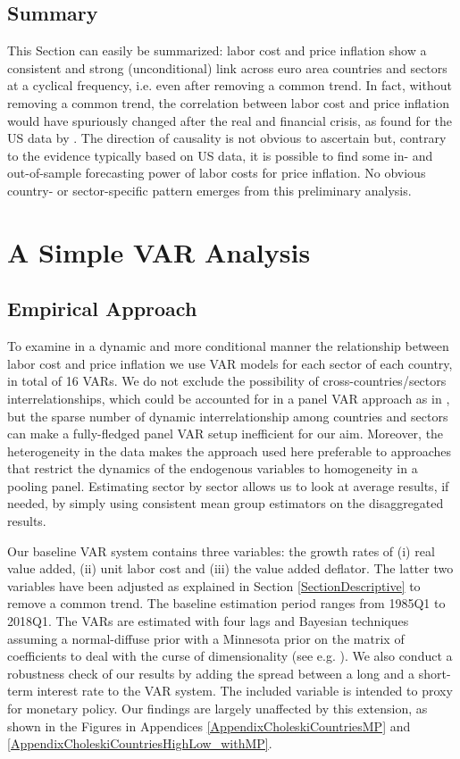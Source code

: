 \documentclass[11pt]{article}
\begin{document}
\subsection{Summary}
This Section can easily be summarized: labor cost and price inflation show a consistent and strong (unconditional) link across euro area countries and sectors at a cyclical frequency, i.e. even after removing a common trend. In fact, without removing a common trend, the correlation between labor cost and price inflation would have spuriously changed after the real and financial crisis, as found for the US data by \cite{Peneva_Rudd_2017}. The direction of causality is not obvious to ascertain but, contrary to the evidence typically based on US data, it is possible to find some in- and out-of-sample forecasting power of labor costs for price inflation. No obvious country- or sector-specific pattern emerges from this preliminary analysis.    

\section{A Simple VAR Analysis}
\subsection{Empirical Approach}
\label{SubSectionempirical}
To examine in a dynamic and more conditional manner the relationship between labor cost and price inflation we use VAR models for each sector of each country, in total of 16 VARs. We do not exclude the possibility of cross-countries/sectors interrelationships, which could be accounted for in a panel VAR approach as in \cite{CanovaCiccarelli09}, but the sparse number of dynamic interrelationship among countries and sectors can make a fully-fledged panel VAR setup inefficient for our aim. Moreover, the heterogeneity in the data makes the approach used here preferable to approaches that restrict the dynamics of the endogenous variables to homogeneity in a pooling panel. Estimating sector by sector allows us to look at average results, if needed, by simply using consistent mean group estimators on the disaggregated results. 

Our baseline VAR system contains three variables: the growth rates of (i) real value added, (ii) unit labor cost and (iii) the value added deflator. The latter two variables have been adjusted as explained in Section \ref{SectionDescriptive} to remove a common trend. The baseline estimation period ranges from 1985Q1 to 2018Q1. The VARs are estimated with four lags and Bayesian techniques assuming a normal-diffuse prior with a Minnesota prior on the matrix of coefficients to deal with the curse of dimensionality (see e.g. \cite{KadyialaKarlsson98}). We also conduct a robustness check of our results by adding the spread between a long and a short-term interest rate to the VAR system. The included variable is intended to proxy for monetary policy. Our findings are largely unaffected by this extension, as shown in the Figures in Appendices \ref{AppendixCholeskiCountriesMP} and \ref{AppendixCholeskiCountriesHighLow_withMP}.
\end{document}
